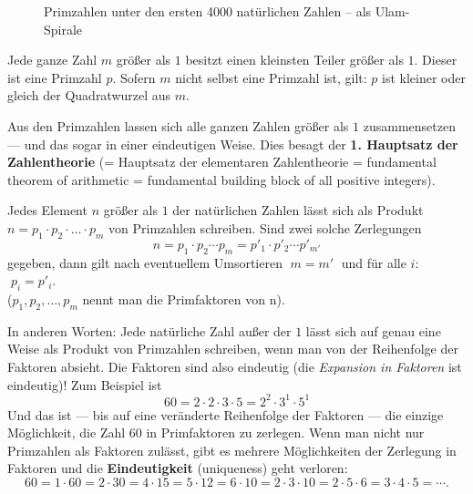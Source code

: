 \begin{refsegment}
\begin{figure}[!hb]
\begin{center}
\caption[Primzahlen unter den ersten 4000 natürlichen Zahlen -- als Ulam-Spirale]
        {Primzahlen unter den ersten 4000 natürlichen Zahlen -- als Ulam-Spirale\protect\footnotemark}
\label{Primes-in-a-4000-integer-ulam-spiral-figure}
\end{center}
\end{figure}



\begin{satz}\label{thm-pz-sqr}
Jede ganze Zahl $m$ größer als $1$ besitzt einen kleinsten Teiler größer als $1$.
Dieser ist eine Primzahl $p$. Sofern $m$ nicht selbst eine Primzahl ist, gilt:
$p$ ist kleiner oder gleich der Quadratwurzel aus $m$.
\end{satz}

Aus den Primzahlen lassen sich alle ganzen Zahlen größer als $1$ zusammensetzen --- und das sogar in
einer eindeutigen Weise. Dies besagt der \textbf{1. Hauptsatz der Zahlentheorie} (= Hauptsatz der elementaren Zahlentheorie =
fundamental theorem of arithmetic = fundamental building block of all positive integers).

\begin{satz}\label{thm-pz-prod}
Jedes Element $n$ größer als $1$ der natürlichen Zahlen lässt sich als Produkt
$n = p_1 \cdot p_2 \cdot \dots \cdot p_m$ von Primzahlen schreiben.
Sind zwei solche Zerlegungen
$$n =  p_1 \cdot p_2 \cdots p_m = p'_1 \cdot p'_2 \cdots p'_{m'}$$
gegeben, dann gilt nach eventuellem Umsortieren $\;m = m'\;$ und  für alle $i$:  $\;p_i = p'_i$. \\
($p_1, p_2, \dots, p_m$ nennt man die Primfaktoren von n).
\end{satz}

In anderen Worten: Jede natürliche Zahl außer der $1$ lässt sich auf genau eine Weise als Produkt von
Primzahlen schreiben, wenn man von der Reihenfolge der Faktoren absieht. Die Faktoren sind also
eindeutig (die {\em Expansion in Faktoren} ist eindeutig)!
Zum Beispiel ist
$$ 60 = 2 \cdot 2 \cdot 3 \cdot 5 = 2^2\cdot 3^1 \cdot 5^1 $$
Und das ist --- bis auf eine veränderte Reihenfolge der Faktoren
--- die einzige Möglichkeit, die Zahl $60$ in Primfaktoren zu
zerlegen. Wenn man nicht nur Primzahlen als Faktoren zulässt,
gibt es mehrere Möglichkeiten der Zerlegung in Faktoren und die
\textbf{Eindeutigkeit} (\hypertarget{uniqueness}{uniqueness}) geht verloren:
$$ 60 = 1 \cdot 60 = 2 \cdot 30 = 4 \cdot 15 = 5 \cdot 12 =6 \cdot 10 = 2 \cdot 3 \cdot 10 =
        2 \cdot 5 \cdot 6 = 3 \cdot 4 \cdot 5 = \cdots . $$


\end{refsegment}

